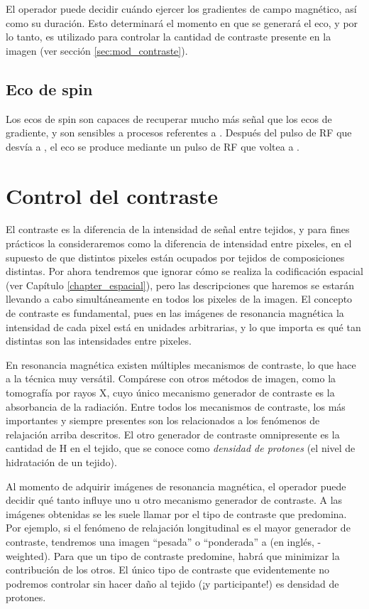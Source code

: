 El operador puede decidir cuándo ejercer los gradientes de campo magnético, así como su duración. Esto determinará el momento en que se generará el eco, y por lo tanto, es utilizado para controlar la cantidad de contraste \Ttwostar presente en la imagen (ver sección \ref{sec:mod_contraste}).


\subsection{Eco de spin}
Los ecos de spin son capaces de recuperar mucho más señal que los ecos de gradiente, y son sensibles a procesos referentes a \Ttwo. Después del pulso de RF que desvía a \M, el eco se produce mediante un pulso de RF que voltea a \degrees. 


\section{Control del contraste}
El contraste es la diferencia de la intensidad de señal entre tejidos, y para fines prácticos la consideraremos como la diferencia de intensidad entre pixeles, en el supuesto de que distintos pixeles están ocupados por tejidos de composiciones distintas. Por ahora tendremos que ignorar cómo se realiza la codificación espacial (ver Capítulo \ref{chapter_espacial}), pero las descripciones que haremos se estarán llevando a cabo simultáneamente en todos los pixeles de la imagen. El concepto de contraste es fundamental, pues en las imágenes de resonancia magnética la intensidad de cada pixel está en unidades arbitrarias, y lo que importa es qué tan distintas son las intensidades entre pixeles.

En resonancia magnética existen múltiples mecanismos de contraste, lo que hace a la técnica muy versátil. Compárese con otros métodos de imagen, como la tomografía por rayos X, cuyo único mecanismo generador de contraste es la absorbancia de la radiación. Entre todos los mecanismos de contraste, los más importantes y siempre presentes son los relacionados a los fenómenos de relajación arriba descritos. El otro generador de contraste omnipresente es la cantidad de H en el tejido, que se conoce como \textit{densidad de protones} (el nivel de hidratación de un tejido). 

Al momento de adquirir imágenes de resonancia magnética, el operador puede decidir qué tanto influye uno u otro mecanismo generador de contraste. A las imágenes obtenidas se les suele llamar por el tipo de contraste que predomina. Por ejemplo, si el fenómeno de relajación longitudinal es el mayor generador de contraste, tendremos una imagen ``pesada'' o ``ponderada'' a \Tone (en inglés, \Tone-weighted). Para que un tipo de contraste predomine, habrá que minimizar la contribución de los otros. El único tipo de contraste que evidentemente no podremos controlar sin hacer daño al tejido (¡y participante!) es densidad de protones.

